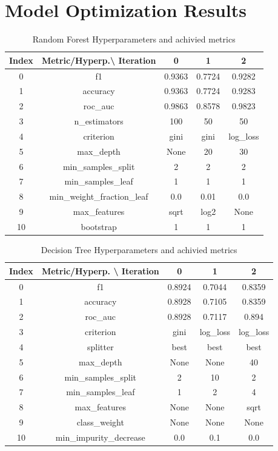 \documentclass{article}%
\begin{document}
%
\newpage%
\section{Model Optimization Results}%
\label{sec:ModelOptimizationResults}%


\begin{table}[h!]%
\caption{Random Forest Hyperparameters and achivied metrics}%
\vspace{0.2cm}%
\centering%
\begin{tabular}{|c||c||c||c||c|}%
\hline%
Index&Metric/Hyperp.\textbackslash{} Iteration&0&1&2\\%
\hline%
0&f1&0.9363&0.7724&0.9282\\%
1&accuracy&0.9363&0.7724&0.9283\\%
2&roc\_auc&0.9863&0.8578&0.9823\\%
3&n\_estimators&100&50&50\\%
4&criterion&gini&gini&log\_loss\\%
5&max\_depth&None&20&30\\%
6&min\_samples\_split&2&2&2\\%
7&min\_samples\_leaf&1&1&1\\%
8&min\_weight\_fraction\_leaf&0.0&0.01&0.0\\%
9&max\_features&sqrt&log2&None\\%
10&bootstrap&1&1&1\\%
\hline%
\end{tabular}%
\end{table}

%


\begin{table}[h!]%
\caption{Decision Tree Hyperparameters and achivied metrics}%
\vspace{0.2cm}%
\centering%
\begin{tabular}{|c||c||c||c||c|}%
\hline%
Index&Metric/Hyperp. \textbackslash{} Iteration&0&1&2\\%
\hline%
0&f1&0.8924&0.7044&0.8359\\%
1&accuracy&0.8928&0.7105&0.8359\\%
2&roc\_auc&0.8928&0.7117&0.894\\%
3&criterion&gini&log\_loss&log\_loss\\%
4&splitter&best&best&best\\%
5&max\_depth&None&None&40\\%
6&min\_samples\_split&2&10&2\\%
7&min\_samples\_leaf&1&2&4\\%
8&max\_features&None&None&sqrt\\%
9&class\_weight&None&None&None\\%
10&min\_impurity\_decrease&0.0&0.1&0.0\\%
\hline%
\end{tabular}%
\end{table}
\end{document}
